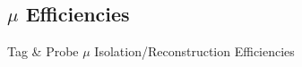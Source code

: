 \documentclass{beamer}
\begin{document}
%
%
\subsection{$\mu$ Efficiencies}
\begin{frame}
 \begin{block}{}
 \centering
 \Large Tag \& Probe $\mu$ Isolation/Reconstruction Efficiencies
 \end{block}
\end{frame}
\end{document}
